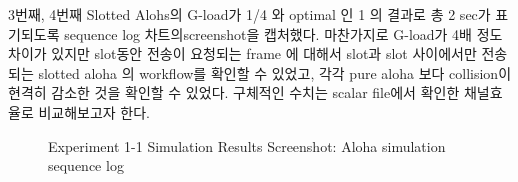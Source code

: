     3번째, 4번째 Slotted Alohs의 G-load가 1/4 와 optimal 인 1 의 결과로 총 2 sec가 표기되도록 sequence log 차트의screenshot을 캡처했다. 마찬가지로 G-load가 4배 정도 차이가 있지만 slot동안 전송이 요청되는 frame 에 대해서 slot과 slot 사이에서만 전송되는 slotted aloha 의 workflow를 확인할 수 있었고, 각각 pure aloha 보다 collision이 현격히 감소한 것을 확인할 수 있었다. 구체적인 수치는 scalar file에서 확인한 채널효율로 비교해보고자 한다. 
    \clearpage
        \begin{figure}[h!]
        \centering
        \hspace{3mm}
        \hspace{3mm}
        \hspace{3mm}
        \vspace{-2mm}
        \caption{Experiment 1-1 Simulation Results Screenshot: Aloha simulation sequence log}
        \end{figure}
     \clearpage